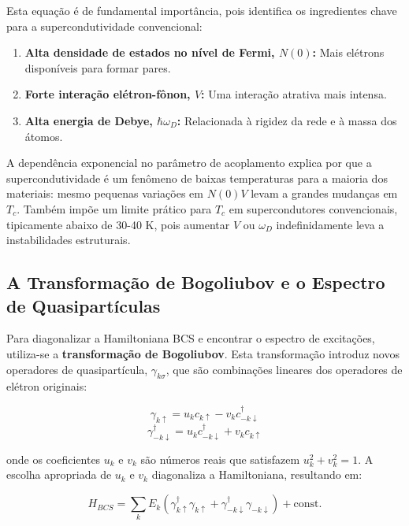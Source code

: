 \documentclass[12pt, a4paper, oneside]{report}
\begin{document}
Esta equação é de fundamental importância, pois identifica os ingredientes chave para a supercondutividade convencional:
\begin{enumerate}
    \item \textbf{Alta densidade de estados no nível de Fermi, $N(0)$:} Mais elétrons disponíveis para formar pares.
    \item \textbf{Forte interação elétron-fônon, $V$:} Uma interação atrativa mais intensa.
    \item \textbf{Alta energia de Debye, $\hbar \omega_D$:} Relacionada à rigidez da rede e à massa dos átomos.
\end{enumerate}

A dependência exponencial no parâmetro de acoplamento explica por que a supercondutividade é um fenômeno de baixas temperaturas para a maioria dos materiais: mesmo pequenas variações em $N(0)V$ levam a grandes mudanças em $T_c$. Também impõe um limite prático para $T_c$ em supercondutores convencionais, tipicamente abaixo de 30-40 K, pois aumentar $V$ ou $\omega_D$ indefinidamente leva a instabilidades estruturais.

\subsection{A Transformação de Bogoliubov e o Espectro de Quasipartículas}

Para diagonalizar a Hamiltoniana BCS e encontrar o espectro de excitações, utiliza-se a \textbf{transformação de Bogoliubov}. Esta transformação introduz novos operadores de quasipartícula, $\gamma_{k\sigma}$, que são combinações lineares dos operadores de elétron originais:

\begin{equation}
    \gamma_{k\uparrow} = u_k c_{k\uparrow} - v_k c_{-k\downarrow}^\dagger
\end{equation}
\begin{equation}
    \gamma_{-k\downarrow}^\dagger = u_k c_{-k\downarrow}^\dagger + v_k c_{k\uparrow}
\end{equation}

onde os coeficientes $u_k$ e $v_k$ são números reais que satisfazem $u_k^2 + v_k^2 = 1$. A escolha apropriada de $u_k$ e $v_k$ diagonaliza a Hamiltoniana, resultando em:

\begin{equation}
    H_{BCS} = \sum_k E_k (\gamma_{k\uparrow}^\dagger \gamma_{k\uparrow} + \gamma_{-k\downarrow}^\dagger \gamma_{-k\downarrow}) + \text{const.}
\end{equation}
\end{document}
